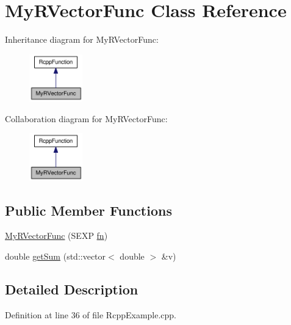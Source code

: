 \hypertarget{classMyRVectorFunc}{
\section{MyRVectorFunc Class Reference}
\label{classMyRVectorFunc}
}
Inheritance diagram for MyRVectorFunc:\nopagebreak
\begin{figure}[H]
\begin{center}
\leavevmode
\includegraphics[width=65pt]{classMyRVectorFunc__inherit__graph}
\end{center}
\end{figure}
Collaboration diagram for MyRVectorFunc:\nopagebreak
\begin{figure}[H]
\begin{center}
\leavevmode
\includegraphics[width=65pt]{classMyRVectorFunc__coll__graph}
\end{center}
\end{figure}
\subsection*{Public Member Functions}
\begin{CompactItemize}
\item 
\hyperlink{classMyRVectorFunc_dc09bab76bddb0c246ed98c942fd4cd8}{MyRVectorFunc} (SEXP \hyperlink{classRcppFunction_a6b5966224b8b7d158be6cdfc3612063}{fn})
\item 
double \hyperlink{classMyRVectorFunc_2eba5a390ca620a687e77208bfbb6df4}{getSum} (std::vector$<$ double $>$ \&v)
\end{CompactItemize}


\subsection{Detailed Description}


Definition at line 36 of file RcppExample.cpp.

